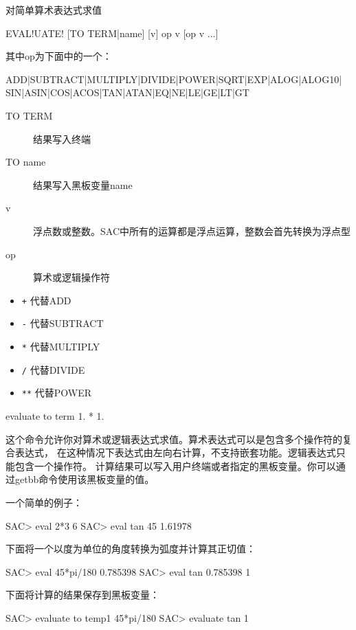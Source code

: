 \label{cmd:evaluate}

对简单算术表达式求值

\begin{SACSTX}
EVAL!UATE! [TO TERM|name] [v] op v [op v ...]
\end{SACSTX}
其中op为下面中的一个：
\begin{SACSTX}
ADD|SUBTRACT|MULTIPLY|DIVIDE|POWER|SQRT|EXP|ALOG|ALOG10|
SIN|ASIN|COS|ACOS|TAN|ATAN|EQ|NE|LE|GE|LT|GT
\end{SACSTX}

\begin{description}
\item [TO TERM] 结果写入终端
\item [TO name] 结果写入黑板变量name
\item [v] 浮点数或整数。SAC中所有的运算都是浮点运算，整数会首先转换为浮点型
\item [op] 算术或逻辑操作符
\end{description}

\begin{itemize}
\item \texttt{+} 代替ADD
\item \texttt{-} 代替SUBTRACT
\item \texttt{*} 代替MULTIPLY
\item \texttt{/} 代替DIVIDE
\item \texttt{**} 代替POWER
\end{itemize}

\begin{SACDFT}
evaluate to term 1. * 1.
\end{SACDFT}

这个命令允许你对算术或逻辑表达式求值。算术表达式可以是包含多个操作符的复合表达式，
在这种情况下表达式由左向右计算，不支持嵌套功能。逻辑表达式只能包含一个操作符。
计算结果可以写入用户终端或者指定的黑板变量。你可以通过getbb命令使用该黑板变量的值。

一个简单的例子：
\begin{SACCode}
SAC> eval 2*3
 6
SAC> eval tan 45
1.61978
\end{SACCode}

下面将一个以度为单位的角度转换为弧度并计算其正切值：
\begin{SACCode}
SAC> eval 45*pi/180
 0.785398
SAC> eval tan 0.785398
 1
\end{SACCode}

下面将计算的结果保存到黑板变量：
\begin{SACCode}
SAC> evaluate to temp1 45*pi/180
SAC> evaluate tan %
 1
\end{SACCode}
